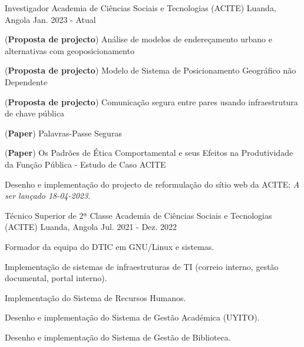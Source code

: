 


\begin{cventries}





\cventry
{Investigador} %
{Academia de Ciências Sociais e Tecnologias (ACITE)} %
{Luanda, Angola} %
{Jan. 2023 - Atual} %
{ %
\begin{cvitems}
    \item (\textbf{Proposta de projecto}) Análise de modelos de endereçamento urbano e alternativas com geoposicionamento
    \item (\textbf{Proposta de projecto}) Modelo de Sistema de Posicionamento Geográfico não Dependente
    \item (\textbf{Proposta de projecto}) Comunicação segura entre pares usando infraestrutura de chave pública
    \item (\textbf{Paper}) Palavras-Passe Seguras
    \item (\textbf{Paper}) Os Padrões de Ética Comportamental e seus Efeitos na Produtividade da Função Pública - Estudo de Caso ACITE
    \item Desenho e implementação do projecto de reformulação do sítio web da ACITE; \textit{A ser lançado 18-04-2023}.
\end{cvitems}
}


\cventry
{Técnico Superior de 2ª Classe} %
{Academia de Ciências Sociais e Tecnologias (ACITE)} %
{Luanda, Angola} %
{Jul. 2021 - Dez. 2022} %
{ %
\begin{cvitems}
    \item Formador da equipa do DTIC em GNU/Linux e sistemas.
    \item Implementação de sistemas de infraestruturas de TI (correio interno, gestão documental, portal interno).
    \item Implementação do Sistema de Recursos Humanos.
    \item Desenho e implementação do Sistema de Gestão Académica (UYITO).
    \item Desenho e implementação do Sistema de Gestão de Biblioteca.
\end{cvitems}
}


\end{cventries}
